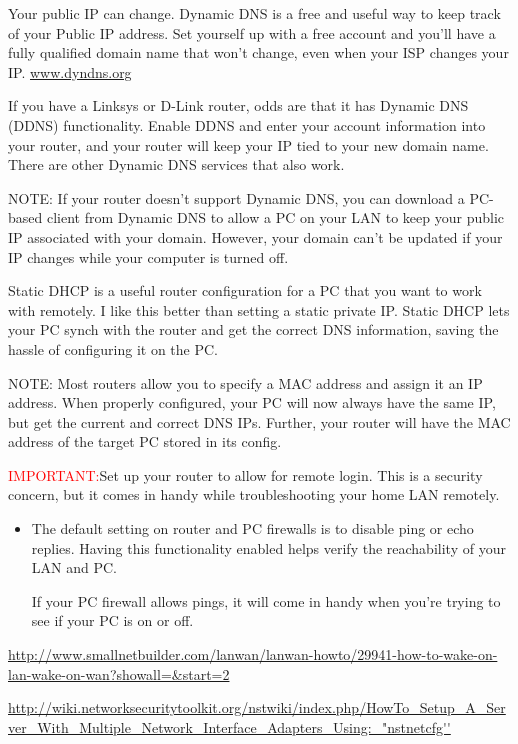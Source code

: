 Your public IP can change. Dynamic DNS is a free and useful way to keep track of
your Public IP address.  
Set yourself up with a free account and you'll have a fully qualified domain
name that won't change, even when your ISP changes your IP.
\url{www.dyndns.org}

If you have a Linksys or D-Link router, odds are that
it has Dynamic DNS (DDNS) functionality. Enable DDNS and enter your account
information into your router, and your router will keep your IP tied to your new
domain name. There are other Dynamic DNS services that also work.  

NOTE: If your router doesn't support Dynamic DNS, you can download a PC-based
client from Dynamic DNS to allow a PC on your LAN to keep your public IP
associated with your domain. However, your domain can't be updated if your IP
changes while your computer is turned off.

Static DHCP is a useful router configuration for a PC that you want to work with
remotely. I like this better than setting a static private IP. Static DHCP lets
your PC synch with the router and get the correct DNS information, saving the
hassle of configuring it on the PC.  

NOTE: Most routers allow you to specify a MAC address and assign it an IP
address. When properly configured, your PC will now always have the same IP, but get the
current and correct DNS IPs. Further, your router will have the MAC address of
the target PC stored in its config.  

\textcolor{red}{IMPORTANT:}Set up your router to allow for remote login. This is
a security concern, but it comes in handy while troubleshooting your home LAN
remotely. 
\begin{itemize}
  \item  The default setting on router and PC firewalls is to disable ping or echo
replies. Having this functionality enabled helps verify the reachability of your
LAN and PC. 
  
  If your PC firewall allows pings, it will come in handy when you're trying to
  see if your PC is on or off. 
\end{itemize}

\url{http://www.smallnetbuilder.com/lanwan/lanwan-howto/29941-how-to-wake-on-lan-wake-on-wan?showall=&start=2}

\url{http://wiki.networksecuritytoolkit.org/nstwiki/index.php/HowTo_Setup_A_Server_With_Multiple_Network_Interface_Adapters_Using:_"nstnetcfg''}

